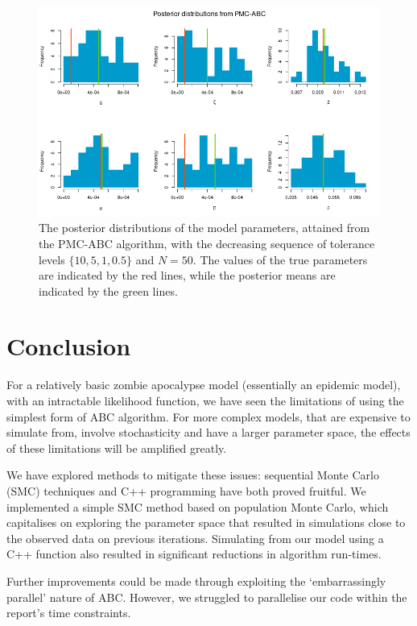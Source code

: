 \documentclass[]{article}
\begin{document}
\begin{figure}[H]
	\centering
	\includegraphics[width=1\linewidth]{../Figures/PMC_posteriors}
	\caption{The posterior distributions of the model parameters, attained from the PMC-ABC algorithm, with the decreasing sequence of tolerance levels $\{ 10, 5, 1, 0.5\}$ and $N=50$. The values of the true parameters are indicated by the red lines, while the posterior means are indicated by the green lines.}
	\label{pmc_abc_posteriors}
\end{figure}

\section{Conclusion}

For a relatively basic zombie apocalypse model (essentially an epidemic model), with an intractable likelihood function, we have seen the limitations of using the simplest form of ABC algorithm. For more complex models, that are expensive to simulate from, involve stochasticity and have a larger parameter space, the effects of these limitations will be amplified greatly. 

We have explored methods to mitigate these issues: sequential Monte Carlo (SMC) techniques and C++ programming have both proved fruitful. We implemented a simple SMC method based on population Monte Carlo, which capitalises on exploring the parameter space that resulted in simulations close to the observed data on previous iterations. Simulating from our model using a C++ function also resulted in significant reductions in algorithm run-times.

Further improvements could be made through exploiting the `embarrassingly parallel' nature of ABC. However, we struggled to parallelise our code within the report's time constraints.
\end{document}
